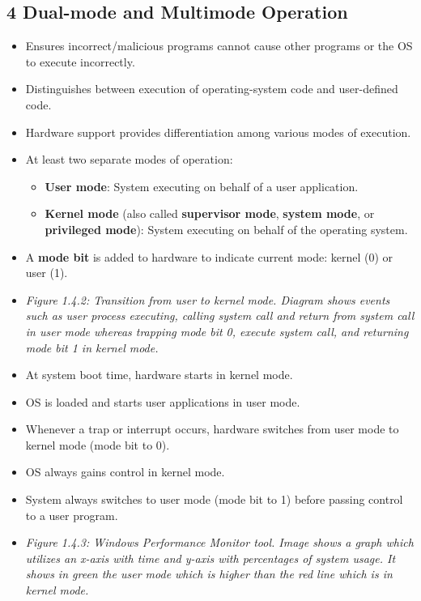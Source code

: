 \documentclass{article}
\begin{document}
\subsection*{4 Dual-mode and Multimode Operation}
\begin{itemize}
    \item Ensures incorrect/malicious programs cannot cause other programs or the OS to execute incorrectly.
    \item Distinguishes between execution of operating-system code and user-defined code.
    \item Hardware support provides differentiation among various modes of execution.
\item At least two separate modes of operation:
    \begin{itemize}
        \item \textbf{User mode}: System executing on behalf of a user application.
        \item \textbf{Kernel mode} (also called \textbf{supervisor mode}, \textbf{system mode}, or \textbf{privileged mode}): System executing on behalf of the operating system.
    \end{itemize}
    \item A \textbf{mode bit} is added to hardware to indicate current mode: kernel (0) or user (1).
    \item \textit{Figure 1.4.2: Transition from user to kernel mode. Diagram shows events such as user process executing, calling system call and return from system call in user mode whereas trapping mode bit 0, execute system call, and returning mode bit 1 in kernel mode.}
    \item At system boot time, hardware starts in kernel mode.
    \item OS is loaded and starts user applications in user mode.
    \item Whenever a trap or interrupt occurs, hardware switches from user mode to kernel mode (mode bit to 0).
    \item OS always gains control in kernel mode.
    \item System always switches to user mode (mode bit to 1) before passing control to a user program.
    \item \textit{Figure 1.4.3: Windows Performance Monitor tool. Image shows a graph which utilizes an x-axis with time and y-axis with percentages of system usage. It shows in green the user mode which is higher than the red line which is in kernel mode.}

\end{itemize}
\end{document}
